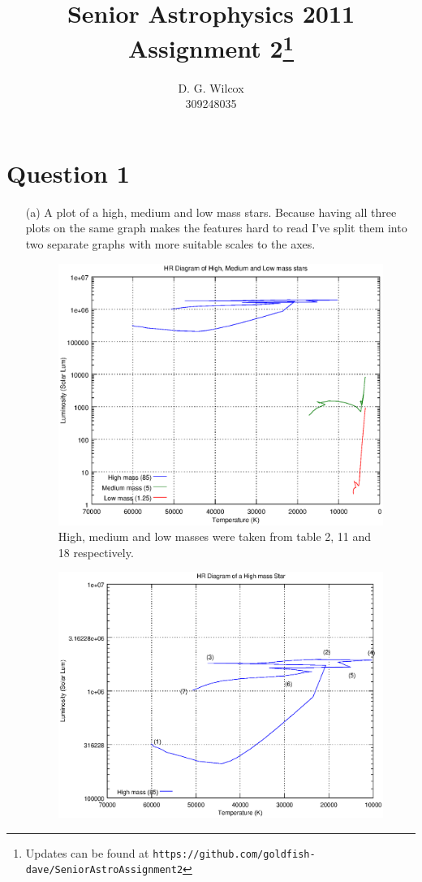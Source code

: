 \documentclass[10pt,a4paper]{article}
\title{Senior Astrophysics 2011 Assignment 2\footnote{Updates can be found at \texttt{https://github.com/goldfish-dave/SeniorAstroAssignment2}}}
\date{}
\author{D. G. Wilcox \\
		309248035}
\begin{document}
\maketitle

\section*{Question 1}
\begin{itemize}
    \item[(a)] A plot of a high, medium and low mass stars.
    Because having all three plots on the same graph makes the features hard to read I've split them into two separate graphs with more suitable scales to the axes.
    \begin{figure}[h!]
        \begin{center}
        \includegraphics[width=0.8\linewidth]{high-mid-low-HR.eps}
        \caption{High, medium and low masses were taken from table 2, 11 and 18 respectively.}
        \end{center}
    \end{figure}
    \newpage
    \begin{figure}[h!]
        \begin{center}
        \includegraphics[width=0.8\linewidth]{high-only-HR.eps}

\end{center}
\end{figure}
\end{itemize}
\end{document}
